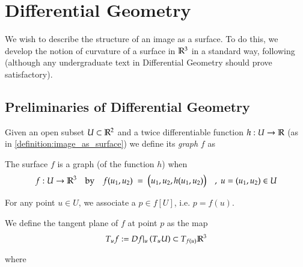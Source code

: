 \section{Differential Geometry} \label{sec:diff-geo}
  
We wish to describe the structure of an image as a surface. To do this, we develop the notion of curvature of a surface in $\mathbb{R}^3$ in a standard way, following \cite{Kuhnel-DiffGeo} (although any undergraduate text in Differential Geometry should prove satisfactory).

\subsection{Preliminaries of Differential Geometry}

    
    
    Given an open subset $U\subset \mathbb{R}^2$ and a twice differentiable function  $h: U \to \mathbb{R}$ (as in \cref{definition:image_as_surface})
    we define its \textit{graph} $f$ as
    
    \begin{defn} \label{definition:graph}
    The surface $f$ is a graph (of the function $h$) when 
    \[
     f: U \to \mathbb{R}^3 \quad \textrm{by} \quad f(u_1, u_2) \;=\; \big(u_1 , u_2 , h(u_1,u_2)\big)
     \quad,\; u = (u_1, u_2) \in U \]
    \end{defn}
    
    For any point $u \in U$, we associate a $p \in f[U]$, i.e. $p = f(u)$.
    
    \begin{defn} \label{definition:tangent plane}
       	
       	We define the tangent plane of $f$ at point $p$ as the map
    \[
    T_u f := Df\vert_u \left(T_u U\right) \subset T_{f(u)} \mathbb{R}^3
    \]
\end{defn}
    where 
            
